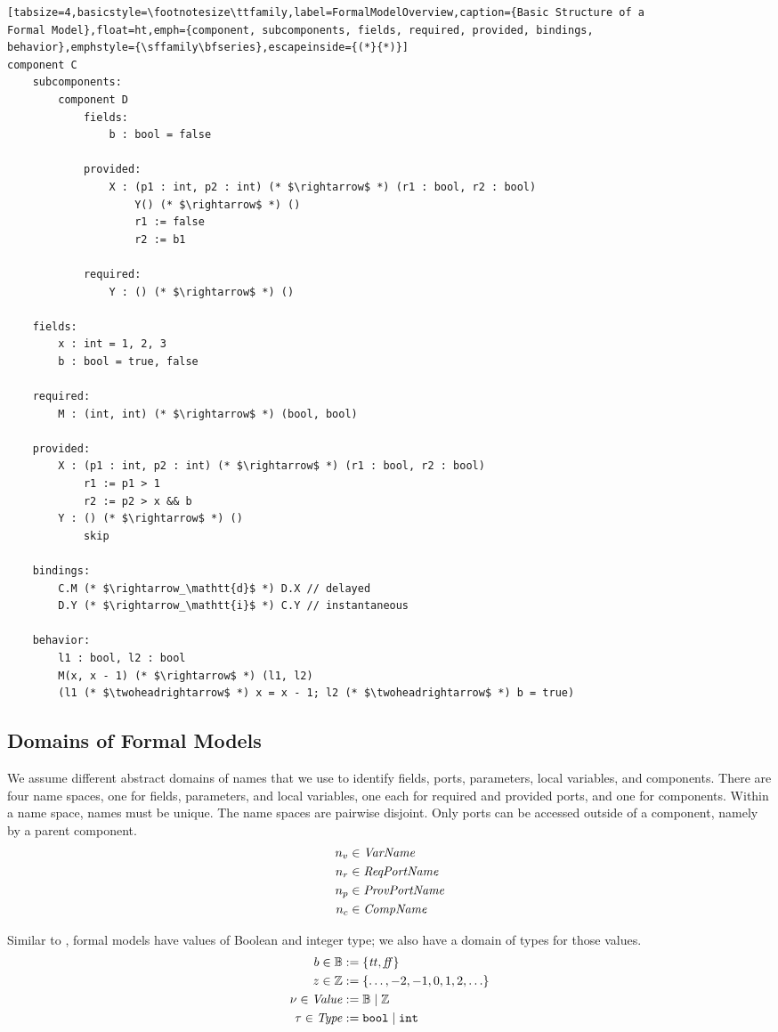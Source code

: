 \documentclass[a4paper,10pt,english]{article}
\begin{document}
\begin{lstlisting}[tabsize=4,basicstyle=\footnotesize\ttfamily,label=FormalModelOverview,caption={Basic Structure of a
Formal Model},float=ht,emph={component, subcomponents, fields, required, provided, bindings,
behavior},emphstyle={\sffamily\bfseries},escapeinside={(*}{*)}]
component C
	subcomponents:
		component D
			fields:
				b : bool = false
				
			provided:
				X : (p1 : int, p2 : int) (* $\rightarrow$ *) (r1 : bool, r2 : bool)
					Y() (* $\rightarrow$ *) ()
					r1 := false
					r2 := b1
					
			required:
				Y : () (* $\rightarrow$ *) ()

	fields:
		x : int = 1, 2, 3
		b : bool = true, false
		
	required:
		M : (int, int) (* $\rightarrow$ *) (bool, bool)
		
	provided:
		X : (p1 : int, p2 : int) (* $\rightarrow$ *) (r1 : bool, r2 : bool)
			r1 := p1 > 1
			r2 := p2 > x && b
		Y : () (* $\rightarrow$ *) ()
			skip
		
	bindings:
		C.M (* $\rightarrow_\mathtt{d}$ *) D.X // delayed
		D.Y (* $\rightarrow_\mathtt{i}$ *) C.Y // instantaneous
	
	behavior:
		l1 : bool, l2 : bool
		M(x, x - 1) (* $\rightarrow$ *) (l1, l2)
		(l1 (* $\twoheadrightarrow$ *) x = x - 1; l2 (* $\twoheadrightarrow$ *) b = true)
\end{lstlisting}

\subsection{Domains of Formal Models}
We assume different abstract domains of names that we use to identify fields, ports, parameters, local variables, and components.
There are four name spaces, one for fields, parameters, and local variables, one each for required and provided ports, and one for
components. Within a name space, names must be unique. The name spaces are pairwise disjoint. Only ports can be accessed
outside of a component, namely by a parent component. 
\begin{align*}
	n_v &\in \mathit{VarName} \\
	n_r &\in \mathit{ReqPortName} \\
	n_p &\in \mathit{ProvPortName} \\
	n_c &\in \mathit{CompName}
\end{align*}

Similar to \Fil, formal models have values of Boolean and integer type; we also have a domain of types
for those values.
\begin{align*}
    b \in \mathbb{B} &:= \{ \mathit{tt}, \mathit{ff} \}
    \\
    z \in \mathbb{Z} &:= \{ \ldots, -2, -1, 0, 1, 2, \ldots \}
    \\
    \nu \in \mathit{Value} &:= \mathbb{B} \mid \mathbb{Z}
    \\
	\tau \in \mathit{Type} &:= \mathtt{bool} \mid \mathtt{int}
\end{align*}
\end{document}
